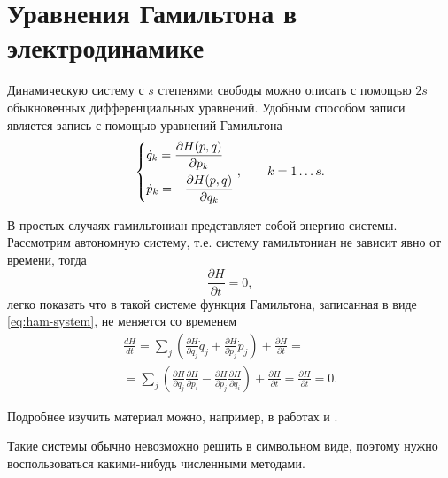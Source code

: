 \section{Уравнения Гамильтона в электродинамике}
Динамическую систему с $s$ степенями свободы можно описать с помощью $2s$
обыкновенных дифференциальных уравнений. Удобным способом записи является
запись с помощью уравнений Гамильтона
\begin{equation}\label{eq:ham-system}
    \begin{dcases}
        \dot q_k = \frac{\partial H(p, q)}{\partial p_k}\\
        \dot p_k = -\frac{\partial H(p, q)}{\partial q_k}
    \end{dcases}, \qquad k = 1\dots s.
\end{equation}

В простых случаях гамильтониан представляет собой энергию системы. Рассмотрим
автономную систему, т.е. систему гамильтониан не зависит явно от времени, тогда
\begin{equation}
    \frac{\partial H}{\partial t} = 0,
\end{equation}
легко показать что в такой системе функция Гамильтона, записанная в виде
\ref{eq:ham-system}, не меняется со временем
\begin{multline}
    \frac{d H}{dt} = \sum_j\left(\frac{\partial H}{\partial q_j}
    \dot q_j + \frac{\partial H}{\partial p_j}\dot p_j\right) + \frac{\partial
    H}{\partial t}
    =\\=
    \sum_j\left(\frac{\partial H}{\partial q_j} \frac{\partial H}{\partial p_i}
    - \frac{\partial H}{\partial p_j}\frac{\partial H}{\partial q_i} \right)
    + \frac{\partial H}{\partial t} = \frac{\partial H}{\partial t} = 0.
\end{multline}

Подробнее изучить материал можно, например, в работах
\cite[с.~123]{hamilton-mech} и \cite[с.~260]{classic-mech}.

Такие системы обычно невозможно решить в символьном виде, поэтому нужно
воспользоваться какими-нибудь численными методами.
